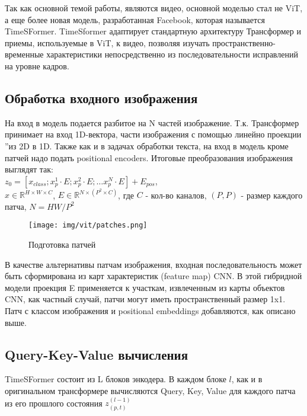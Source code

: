 \documentclass[PMI,VKR]{HSEUniversity}
\begin{document}
Так как основной темой работы, являются видео, основной моделью стал не ViT, а еще более новая модель, разработанная Facebook, которая называется TimeSFormer. 
TimeSformer\cite{timesformer:2021} адаптирует стандартную архитектуру Трансформер и приемы, используемые в ViT, к видео, позволяя изучать пространственно-временные характеристики непосредственно из последовательности исправлений на уровне кадров. 

\subsection{Обработка входного изображения}

На вход в модель подается разбитое на N частей изображение. Т.к. Трансформер принимает на вход 1D-вектора,  части изображения с помощью линейно проекции \textquotedblright из 2D в 1D.
Также как и в задачах обработки текста, на вход в модель кроме патчей надо подать positional encoders.
Итоговые преобразования изображения выглядят так: \\

\noindent$z_{0} = [x_{class}; x^1_{p} \cdot E; x^2_{p} \cdot E; \dots x^N_{p} \cdot E] + E_{pos} $,\\
$x \in \mathds{R}^{H \times W \times C}$, $E \in \mathds{R}^{N \times (P^{2} \times C)}$,
где $C$ - кол-во каналов, $(P, P)$ - размер каждого патча, $N = HW / P^2$

\begin{figure}[h]
    \centering
    \texttt{[image: img/vit/patches.png]}
    \caption{Подготовка патчей}
\end{figure}

В качестве альтернативы патчам изображения, входная последовательность может быть сформирована
из карт характеристик (feature map) CNN. В этой гибридной модели проекция E применяется к участкам, извлеченным из карты объектов CNN, как частный случай, патчи могут иметь пространственный размер 1x1.
Патч с классом изображения и positional embeddings добавляются, как описано выше.


\subsection{Query-Key-Value вычисления}

TimeSFormer состоит из L блоков энкодера. В каждом блоке $l$, как и в оригинальном трансформере вычисляются Query, Key, Value для каждого патча из его прошлого состояния $z_{(p, t)}^{(l-1)}$
\end{document}
